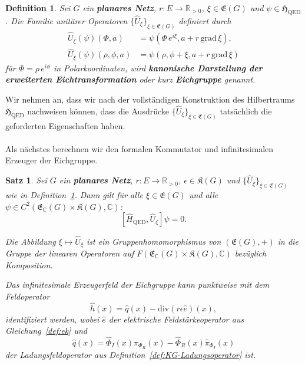 \documentclass[11pt,a4paper,leqno]{report}
\newtheorem{proposition}{Satz}[chapter]
\newtheorem{definition}[theorem]{Definition}
\numberwithin{equation}{chapter}
\begin{document}
\begin{definition}\label{def:QED-Eichgruppe}
	Sei $G$ ein \textbf{planares Netz}, $r:E\to\mathbb{R}_{>0}$, $\xi\in\mathfrak{E}(G)$ und $\psi\in\mathfrak{H}_{\mathrm{QED}}$. 
	Die Familie unitärer Operatoren $\{\hat{U}_\xi\}_{\xi\in\mathfrak{E}(G)}$ definiert durch
	\begin{align}
		\hat{U}_\xi(\psi)(\Phi, a) &= \psi(\Phi\,e^{i\xi}, a + r\,\mathrm{grad}\,\xi), \label{eq:QED-Uxi-kartesisch} \\
		\hat{U}_\xi(\psi)(\rho, \phi, a) &= \psi(\rho, \phi + \xi, a + r\,\mathrm{grad}\,\xi) \label{eq:QED-Uxi-polar}
	\end{align}
	für $\Phi = \rho\,e^{i\phi}$ in Polarkoordinaten,
	wird \textbf{kanonische Darstellung der erweiterten Eichtransformation} oder kurz \textbf{Eichgruppe} genannt.
\end{definition}
\noindent
Wir nehmen an, dass wir nach der vollständigen Konstruktion des Hilbertraums $\mathfrak{H}_{\mathrm{QED}}$ nachweisen können, dass die Ausdrücke $\{\hat{U}_\xi\}_{\xi\in\mathfrak{E}(G)}$ tatsächlich die geforderten Eigenschaften haben.\\
\\
Als nächstes berechnen wir den formalen Kommutator und infinitesimalen Erzeuger der Eichgruppe.
\begin{proposition}\label{prop:QED-Eich-Invarianz}
	Sei $G$ ein \textbf{planares Netz}, $r:E\to\mathbb{R}_{>0}$, $\epsilon\in\mathfrak{K}(G)$ und $\{\hat{U}_\xi\}_{\xi\in\mathfrak{E}(G)}$ wie in Definition~\ref{def:QED-Eichgruppe}. Dann gilt für alle $\xi\in\mathfrak{E}(G)$ und alle $\psi\in C^2(\mathfrak{E}_\mathbb{C}(G)\times\mathfrak{K}(G),\mathbb{C})$:
	\begin{equation}\label{eq:QED-HU-comm}
		[\hat{H}_{\mathrm{QED}}, \hat{U}_\xi]\psi = 0.
	\end{equation}
	
	\noindent
	Die Abbildung $\xi\mapsto\hat{U}_\xi$ ist ein Gruppenhomomorphismus von $(\mathfrak{E}(G),+)$ in die Gruppe der linearen Operatoren auf $F(\mathfrak{E}_\mathbb{C}(G)\times\mathfrak{K}(G),\mathbb{C})$ bezüglich Komposition.
	
	\noindent
	Das infinitesimale Erzeugerfeld der Eichgruppe kann punktweise mit dem  Feldoperator
	\begin{equation}\label{eq:QED-Eichgenerator}
		\hat{h}(x) = \hat{q}(x) - \mathrm{div}(r\epsilon\hat{e})(x),
	\end{equation}
	identifiziert werden, wobei $\hat{e}$ der elektrische Feldstärkeoperator aus Gleichung~\eqref{def:ek} und
	\[
	\hat{q}(x) = \hat{\Phi}_I(x)\hat{\pi}_{\Phi_R}(x) - \hat{\Phi}_R(x)\hat{\pi}_{\Phi_I}(x)
	\]
	der Ladungsfeldoperator aus Definition~\ref{def:KG-Ladungsoperator} ist. 
\end{proposition}
\end{document}
